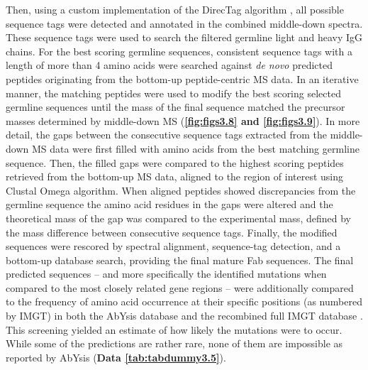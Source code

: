 Then, using a custom implementation of the DirecTag algorithm \cite{tabb2008directag:}, all possible sequence tags were detected and annotated in the combined middle-down spectra. These sequence tags were used to search the filtered germline light and heavy IgG chains. For the best scoring germline sequences, consistent sequence tags with a length of more than 4 amino acids were searched against \emph{de novo} predicted peptides originating from the bottom-up peptide-centric MS data. In an iterative manner, the matching peptides were used to modify the best scoring selected germline sequences until the mass of the final sequence matched the precursor masses determined by middle-down MS (\textbf{\autoref{fig:figs3.8} and \autoref{fig:figs3.9}}). In more detail, the gaps between the consecutive sequence tags extracted from the middle-down MS data were first filled with amino acids from the best matching germline sequence. Then, the filled gaps were compared to the highest scoring peptides retrieved from the bottom-up MS data, aligned to the region of interest using Clustal Omega algorithm. When aligned peptides showed discrepancies from the germline sequence the amino acid residues in the gaps were altered and the theoretical mass of the gap was compared to the experimental mass, defined by the mass difference between consecutive sequence tags. Finally, the modified sequences were rescored by spectral alignment, sequence-tag detection, and a bottom-up database search, providing the final mature Fab sequences. The final predicted sequences – and more specifically the identified mutations when compared to the most closely related gene regions – were additionally compared to the frequency of amino acid occurrence at their specific positions (as numbered by IMGT) in both the AbYsis database \cite{swindells2017abysis:} and the recombined full IMGT database \cite{lefranc1999imgt}. This screening yielded an estimate of how likely the mutations were to occur. While some of the predictions are rather rare, none of them are impossible as reported by AbYsis (\textbf{Data \ref{tab:tabdummy3.5}}).

